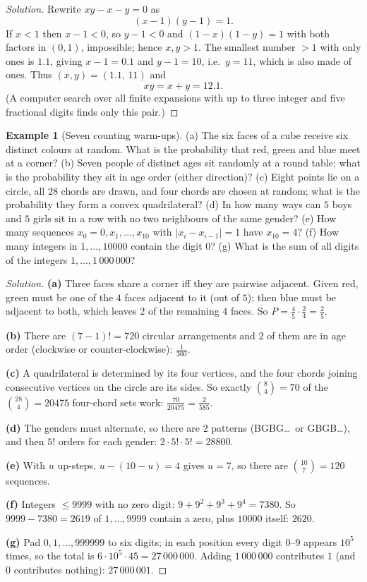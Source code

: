 \documentclass[11pt]{article}
\theoremstyle{definition}
\newtheorem{example}{Example}[section]
\begin{document}
\begin{proof}[Solution]
Rewrite $xy-x-y=0$ as
\[
(x-1)(y-1)=1 .
\]
If $x<1$ then $x-1<0$, so $y-1<0$ and $(1-x)(1-y)=1$ with both factors in $(0,1)$, impossible; hence $x,y>1$. The smallest number $>1$ with only ones is $1.1$, giving $x-1=0.1$ and $y-1=10$, i.e.\ $y=11$, which is also made of ones. Thus $(x,y)=(1.1,\,11)$ and
\[
xy=x+y=\boxed{12.1}.
\]
(A computer search over all finite expansions with up to three integer and five fractional digits finds only this pair.)
\end{proof}

\begin{example}[Seven counting warm-ups]
(a) The six faces of a cube receive six distinct colours at random. What is the probability that red, green and blue meet at a corner? (b) Seven people of distinct ages sit randomly at a round table; what is the probability they sit in age order (either direction)? (c) Eight points lie on a circle, all $28$ chords are drawn, and four chords are chosen at random; what is the probability they form a convex quadrilateral? (d) In how many ways can $5$ boys and $5$ girls sit in a row with no two neighbours of the same gender? (e) How many sequences $x_0=0,x_1,\dots,x_{10}$ with $|x_i-x_{i-1}|=1$ have $x_{10}=4$? (f) How many integers in $1,\dots,10000$ contain the digit $0$? (g) What is the sum of all digits of the integers $1,\dots,1\,000\,000$?
\end{example}

\begin{proof}[Solution]
\textbf{(a)} Three faces share a corner iff they are pairwise adjacent. Given red, green must be one of the $4$ faces adjacent to it (out of $5$); then blue must be adjacent to both, which leaves $2$ of the remaining $4$ faces. So $P=\tfrac45\cdot\tfrac24=\boxed{\tfrac25}$.

\textbf{(b)} There are $(7-1)!=720$ circular arrangements and $2$ of them are in age order (clockwise or counter-clockwise): $\boxed{\tfrac1{360}}$.

\textbf{(c)} A quadrilateral is determined by its four vertices, and the four chords joining consecutive vertices on the circle are its sides. So exactly $\binom84=70$ of the $\binom{28}4=20475$ four-chord sets work: $\boxed{\tfrac{70}{20475}=\tfrac2{585}}$.

\textbf{(d)} The genders must alternate, so there are $2$ patterns (BGBG\dots\ or GBGB\dots), and then $5!$ orders for each gender: $2\cdot5!\cdot5!=\boxed{28800}$.

\textbf{(e)} With $u$ up-steps, $u-(10-u)=4$ gives $u=7$, so there are $\binom{10}7=\boxed{120}$ sequences.

\textbf{(f)} Integers $\le9999$ with no zero digit: $9+9^2+9^3+9^4=7380$. So $9999-7380=2619$ of $1,\dots,9999$ contain a zero, plus $10000$ itself: $\boxed{2620}$.

\textbf{(g)} Pad $0,1,\dots,999999$ to six digits; in each position every digit $0$--$9$ appears $10^5$ times, so the total is $6\cdot10^5\cdot45=27\,000\,000$. Adding $1\,000\,000$ contributes $1$ (and $0$ contributes nothing): $\boxed{27\,000\,001}$.
\end{proof}
\end{document}
